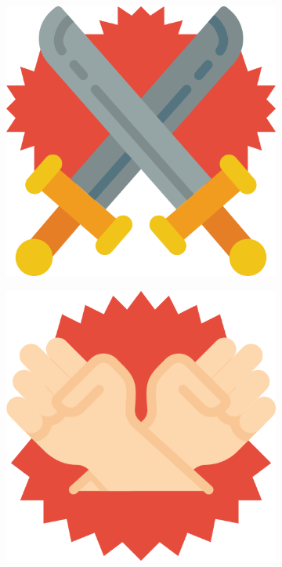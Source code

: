 \begin{figure}[h]
    \begin{subfigure}{.1\textwidth}
        \centering
        \includegraphics[width=.8\linewidth]{images/icons/003-swords.png}
    \end{subfigure}
    \begin{subfigure}{.1\textwidth}
        \centering
        \includegraphics[width=.8\linewidth]{images/icons/005-fists.png}
    \end{subfigure}
    \begin{subfigure}{.1\textwidth}
        \centering

\end{subfigure}
\end{figure}
